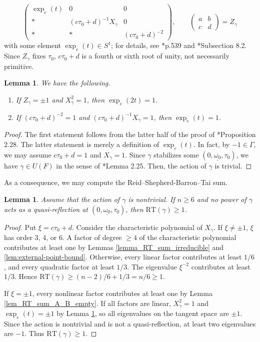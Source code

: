 \documentclass[11pt]{amsart}
\theoremstyle{plain}
\newtheorem{lem}[thm]{Lemma}
\theoremstyle{definition}
\numberwithin{equation}{section}
\def\exp{\mathop{\mathrm{exp}}\nolimits}
\newcommand{\abcd}{\begin{pmatrix}a & b \\ c & d \end{pmatrix}
}
\begin{document}
\[
\begin{pmatrix}
    \exp_e(t) & 0 & 0\\
    * & (c\tau_0 + d)^{-1} X_\gamma & 0\\
    * & * & (c\tau_0+d)^{-2}
\end{pmatrix}, \qquad \abcd= Z_\gamma
\]
with some element $\exp_e(t)\in S^1$; for details, see \cite{Gritsenko2007kodaira}*{p.539} and \cite{kondo1993kodaira}*{Subsection 8.2}.
Since $Z_\gamma$ fixes $\tau_0$, $c\tau_0+d$ is a fourth or sixth root of unity, not necessarily primitive.
\begin{lem}\label{lem_action_exp_e}
    We have the following.
    \begin{enumerate}
        \item 
    If $Z_\gamma = \pm 1$ and $X_\gamma^2 = 1$, then $\exp_e(2t) = 1$.
    \item 
    If $(c\tau_0 + d)^{-2} = 1$ and $(c\tau_0 + d)^{-1}X_\gamma =1$, then $\exp_e(t) = 1$.
    \end{enumerate}
\end{lem}
\begin{proof}
    The first statement follows from the latter half of the proof of \cite{Gritsenko2007kodaira}*{Proposition 2.28}.
    The latter statement is merely a definition of $\exp_e(t)$.
    In fact, by $-1 \in \Gamma$, we may assume $c\tau_0 + d =1$ and $X_\gamma = 1$.
    Since $\gamma$ stabilizes some $(0, \underline{\omega_0}, \tau_0)$, we have $\gamma \in U(F)$ in the sense of \cite{Gritsenko2007kodaira}*{Lemma 2.25}.
    Then, the action of $\gamma$ is trivial.
\end{proof}
As a consequence, we may compute the Reid--Shepherd-Barron--Tai sum.
\begin{lem}\label{lem_interior_orthogonal_>1}
Assume that the action of $\gamma$
is nontrivial.
    If $n \geq 6$ and no power of $\gamma$ acts as a quasi-reflection at $(0,\underline{\omega_0},\tau_0)$, then $\mathrm{RT}(\gamma) \geq 1$.
\end{lem}
\begin{proof}
Put $\xi=c\tau_0+d$.
Consider the characteristic polynomial of $X_\gamma$.
If $\xi\neq\pm1$, $\xi$ has order $3$, $4$, or $6$.
A factor of degree $\geq 4$ of the characteristic polynomial contributes at least one
by Lemmas
\ref{lemma_RT_sum_irreducible} and
\ref{lem:external-point-bound}.
Otherwise, every linear factor contributes
at least $1/6$, and every quadratic factor at least $1/3$.
The 
eigenvalue $\xi^{-2}$ contributes at least $1/3$.
Hence $\mathrm{RT}(\gamma)\geq(n-2)/6+1/3=n/6\geq1$.

If $\xi=\pm1$, every nonlinear 
factor contributes at least one by Lemma \ref{lem_RT_sum_A_B_empty}. 
If all factors are linear, $X_\gamma^2=1$ and $\exp_e(t)=\pm1$ by Lemma \ref{lem_action_exp_e},
so all eigenvalues on the tangent space are $\pm1$.
Since the action is nontrivial and is not a
quasi-reflection, at least two eigenvalues are $-1$.
Thus $\mathrm{RT}(\gamma)\geq1$.
\end{proof}
\end{document}
